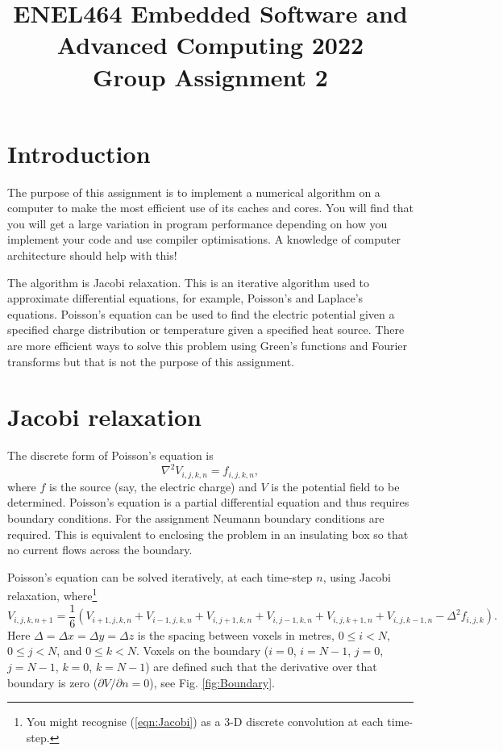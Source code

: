 \documentclass[a4paper,11pt]{article}
\begin{document}
\title{ \bf ENEL464 Embedded Software and Advanced Computing 2022 \\ Group Assignment 2}
\author{}
\date{}
\maketitle


\section{Introduction}

The purpose of this assignment is to implement a numerical algorithm
on a computer to make the most efficient use of its caches and cores.
You will find that you will get a large variation in program
performance depending on how you implement your code and use compiler
optimisations.  A knowledge of computer architecture should help with
this!

The algorithm is Jacobi relaxation.  This is an iterative algorithm
used to approximate differential equations, for example, Poisson's and
Laplace's equations.  Poisson's equation can be used to find the
electric potential given a specified charge distribution or
temperature given a specified heat source.  There are more efficient
ways to solve this problem using Green's functions and Fourier
transforms but that is not the purpose of this assignment.

\section{Jacobi relaxation}

The discrete form of Poisson's equation is
%
\begin{equation}
  \nabla^2 V_{i,j,k,n} = f_{i,j,k,n},
\end{equation}
%
where $f$ is the source (say, the electric charge) and $V$ is the
potential field to be determined.  Poisson's equation is a partial
differential equation and thus requires boundary conditions.  For the
assignment Neumann boundary conditions are required.  This is
equivalent to enclosing the problem in an insulating box so that no
current flows across the boundary.

Poisson's equation can be solved iteratively, at each time-step $n$,
using Jacobi relaxation, where\footnote{You might recognise
  (\ref{eqn:Jacobi}) as a 3-D discrete convolution at each time-step.}
%
\begin{equation}
  V_{i,j,k,n+1} = \frac{1}{6} \left(V_{i+1,j,k,n} + V_{i-1,j,k,n} + V_{i,j+1,k,n} + V_{i,j-1,k,n} + V_{i,j,k+1,n} + V_{i,j,k-1,n} - \Delta^2 f_{i,j,k}\right).
\label{eqn:Jacobi}
\end{equation}
%
Here $\Delta = \Delta x = \Delta y = \Delta z$ is the spacing between
voxels in metres, $0 \le i < N$, $0 \le j < N$, and $0 \le k <
N$. Voxels on the boundary ($i = 0$, $i=N-1$, $j = 0$, $j=N-1$, $k =
0$, $k=N-1$) are defined such that the derivative over that boundary is
zero ($\partial V / \partial n = 0$), see Fig.  \ref{fig:Boundary}.
\end{document}
